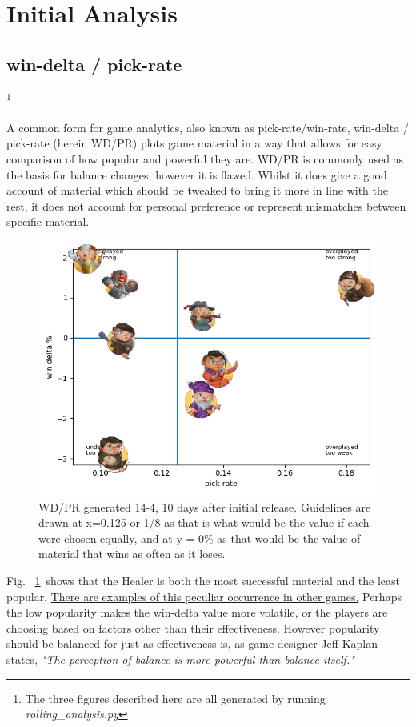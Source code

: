 \documentclass{tufte-handout}
\begin{document}
\section{Initial Analysis}

\subsection{win-delta / pick-rate}\footnote{The three figures described here are all generated by running \textit{rolling\_analysis.py}}

A common form for game analytics, also known as pick-rate/win-rate, win-delta / pick-rate (herein WD/PR) plots game material in a way that allows for easy comparison of how popular and powerful they are. WD/PR is commonly used as the basis for balance changes, however it is flawed. Whilst it does give a good account of material which should be tweaked to bring it more in line with the rest, it does not account for personal preference or represent mismatches between specific material. 

\begin{figure}
    \centering
    \includegraphics{pick-win.png}
    \caption{WD/PR generated 14-4, 10 days after initial release. Guidelines are drawn at x=0.125 or 1/8 as that is what would be the value if each were chosen equally, and at y = 0\% as that would be the value of material that wins as often as it loses.}
    \label{fig:WD/PR}
\end{figure}


Fig. ~\ref{fig:WD/PR}~shows that the Healer is both the most successful material and the least popular. \href{'https://staticctf.akamaized.net/J3yJr34U2pZ2Ieem48Dwy9uqj5PNUQTn/2MXEODt9QteOU3WGh4vmNE/51261bebfc558521b7411ccb78ece4fb/Y5S1_Matrix_Attackers.png'}{There are examples of this peculiar occurrence in other games.} Perhaps the low popularity makes the win-delta value more volatile, or the players are choosing based on factors other than their effectiveness. However popularity should be balanced for just as effectiveness is, as game designer Jeff Kaplan states, \textit{"The perception of balance is more powerful than balance itself."}
\end{document}
